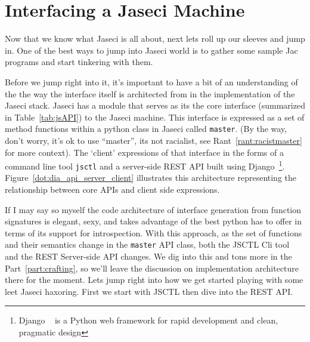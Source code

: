 \chapter{Interfacing a Jaseci Machine}
Now that we know what Jaseci is all about, next lets roll up our sleeves and jump in. One of the best ways to jump into Jaseci world is to gather some sample Jac programs and start tinkering with them.
\par
Before we jump right into it, it's important to have a bit of an understanding of the the way the interface itself is architected from in the implementation of the Jaseci stack. Jaseci has a module that serves as its  the core interface (summarized in Table~\ref{tab:jsAPI}) to the Jaseci machine. This interface is expressed as a set of method functions within a python class in Jaseci  called \texttt{master}. (By the way, don't worry, it's ok to use ``master'', its not racialist, see Rant~\ref{rant:racistmaster} for more context). The `client' expressions of that interface in the forms of a command line tool \texttt{jsctl} and a server-side REST API built using Django~\footnote{Django ~\cite{django} is a Python web framework for rapid development and clean, pragmatic design}. Figure~\ref{dot:dia_api_server_client} illustrates this architecture representing the relationship between core APIs and client side expressions.

If I may say so myself the code architecture of interface generation from function signatures is elegant, sexy, and takes advantage of the best python has to offer in terms of its support for introspection. With this approach, as the set of functions and their semantics change in the \texttt{master} API class, both the JSCTL Cli tool and the REST Server-side API changes. We dig into this and tons more in the Part~\ref{part:crafting}, so we'll leave the discussion on implementation architecture there for the moment. Lets jump right into how we get started playing with some \gls{leet} Jaseci \gls{haxor}ing. First we start with JSCTL then dive into the REST API.


